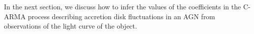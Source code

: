 \documentclass[a4paper,fleqn,usenatbib]{mnras}
\begin{document}
In the next section, we discuss how to infer the values of the coefficients in the C-ARMA process describing accretion disk fluctuations in an AGN from observations of the light curve of the object.





\end{document}

